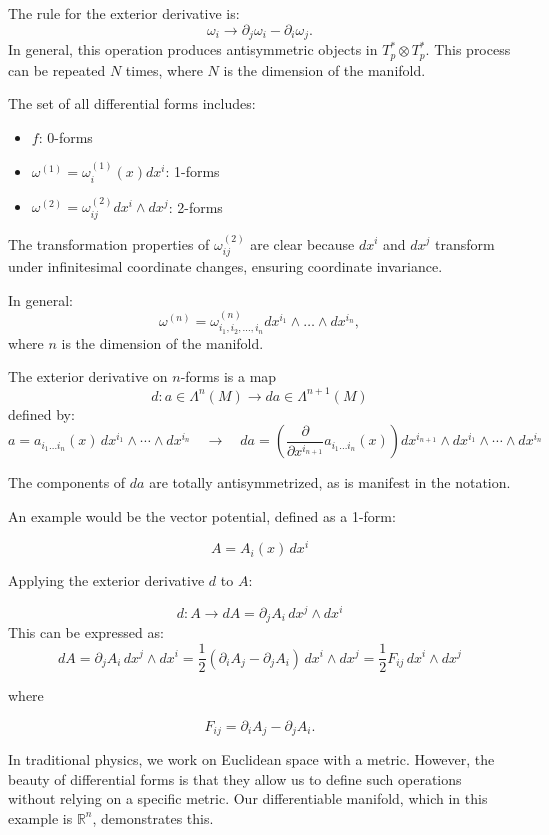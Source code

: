 \documentclass{article}
\begin{document}
The rule for the exterior derivative is:
\[
\omega_i \to \partial_j \omega_i - \partial_i \omega_j.
\]
In general, this operation produces antisymmetric objects in \(T_p^* \otimes T_p^*\). This process can be repeated \(N\) times, where \(N\) is the dimension of the manifold.

The set of all differential forms includes:
\begin{itemize}
    \item \( f \): 0-forms
    \item \( \omega^{(1)} = \omega_i^{(1)}(x) dx^i \): 1-forms
    \item \( \omega^{(2)} = \omega_{ij}^{(2)} dx^i \wedge dx^j \): 2-forms
\end{itemize}

The transformation properties of \(\omega_{ij}^{(2)}\) are clear because \(dx^i\) and \(dx^j\) transform under infinitesimal coordinate changes, ensuring coordinate invariance.

In general:
\[
\omega^{(n)} = \omega_{i_1, i_2, \ldots, i_n}^{(n)} dx^{i_1} \wedge \ldots \wedge dx^{i_n},
\]
where \(n\) is the dimension of the manifold.

\begin{theorem}
    The exterior derivative on $n$-forms is a map
\[
d : a \in \Lambda^n(M) \to da \in \Lambda^{n+1}(M)
\]
defined by:
\[
a = a_{i_1 \ldots i_n}(x) \, dx^{i_1} \wedge \cdots \wedge dx^{i_n} \quad \longrightarrow \quad da = \left( \frac{\partial}{\partial x^{i_{n+1}}} a_{i_1 \ldots i_n}(x) \right) dx^{i_{n+1}} \wedge dx^{i_1} \wedge \cdots \wedge dx^{i_n}
\]    
\end{theorem}
The components of $da$ are totally antisymmetrized, as is manifest in the notation. 

An example would be the vector potential, defined as a 1-form:

\[ 
A = A_i(x) \, dx^i 
\]

Applying the exterior derivative \( d \) to \( A \):

\[
d: A \to dA = \partial_j A_i \, dx^j \wedge dx^i 
\]
This can be expressed as:
\[
dA = \partial_j A_i \, dx^j \wedge dx^i 
    = \frac{1}{2} (\partial_i A_j - \partial_j A_i) \, dx^i \wedge dx^j 
    = \frac{1}{2} F_{ij} \, dx^i \wedge dx^j 
\]

where

\[
F_{ij} = \partial_i A_j - \partial_j A_i.
\]

In traditional physics, we work on Euclidean space with a metric. However, the beauty of differential forms is that they allow us to define such operations without relying on a specific metric. Our differentiable manifold, which in this example is \(\mathbb{R}^n\), demonstrates this.
\end{document}
